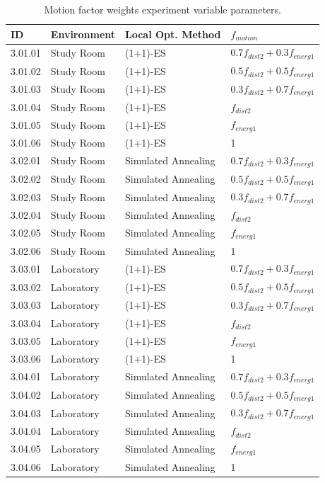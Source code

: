 \begin{table}[ht]
\centering
\caption{Motion factor weights experiment variable parameters.}
\label{tab:motion_weights_params}
\begin{tabular}{@{}llll@{}}
\hline
    ID & Environment & Local Opt. Method & $f_{motion}$ \\
\hline
    3.01.01 & Study Room & (1+1)-ES & $0.7f_{dist2} + 0.3f_{energ1}$ \\
    3.01.02 & Study Room & (1+1)-ES & $0.5f_{dist2} + 0.5f_{energ1}$ \\
    3.01.03 & Study Room & (1+1)-ES & $0.3f_{dist2} + 0.7f_{energ1}$ \\
    3.01.04 & Study Room & (1+1)-ES & $f_{dist2}$ \\
    3.01.05 & Study Room & (1+1)-ES & $f_{energ1}$ \\
    3.01.06 & Study Room & (1+1)-ES & 1 \\
    \noalign{\smallskip}
    3.02.01 & Study Room & Simulated Annealing & $0.7f_{dist2} + 0.3f_{energ1}$ \\
    3.02.02 & Study Room & Simulated Annealing & $0.5f_{dist2} + 0.5f_{energ1}$ \\
    3.02.03 & Study Room & Simulated Annealing & $0.3f_{dist2} + 0.7f_{energ1}$ \\
    3.02.04 & Study Room & Simulated Annealing & $f_{dist2}$ \\
    3.02.05 & Study Room & Simulated Annealing & $f_{energ1}$ \\
    3.02.06 & Study Room & Simulated Annealing & 1 \\
    \noalign{\smallskip}
    3.03.01 & Laboratory & (1+1)-ES & $0.7f_{dist2} + 0.3f_{energ1}$ \\
    3.03.02 & Laboratory & (1+1)-ES & $0.5f_{dist2} + 0.5f_{energ1}$ \\
    3.03.03 & Laboratory & (1+1)-ES & $0.3f_{dist2} + 0.7f_{energ1}$ \\
    3.03.04 & Laboratory & (1+1)-ES & $f_{dist2}$ \\
    3.03.05 & Laboratory & (1+1)-ES & $f_{energ1}$ \\
    3.03.06 & Laboratory & (1+1)-ES & 1 \\
    \noalign{\smallskip}
    3.04.01 & Laboratory & Simulated Annealing & $0.7f_{dist2} + 0.3f_{energ1}$ \\
    3.04.02 & Laboratory & Simulated Annealing & $0.5f_{dist2} + 0.5f_{energ1}$ \\
    3.04.03 & Laboratory & Simulated Annealing & $0.3f_{dist2} + 0.7f_{energ1}$ \\
    3.04.04 & Laboratory & Simulated Annealing & $f_{dist2}$ \\
    3.04.05 & Laboratory & Simulated Annealing & $f_{energ1}$ \\
    3.04.06 & Laboratory & Simulated Annealing & 1 \\
\hline
\end{tabular}
\end{table}